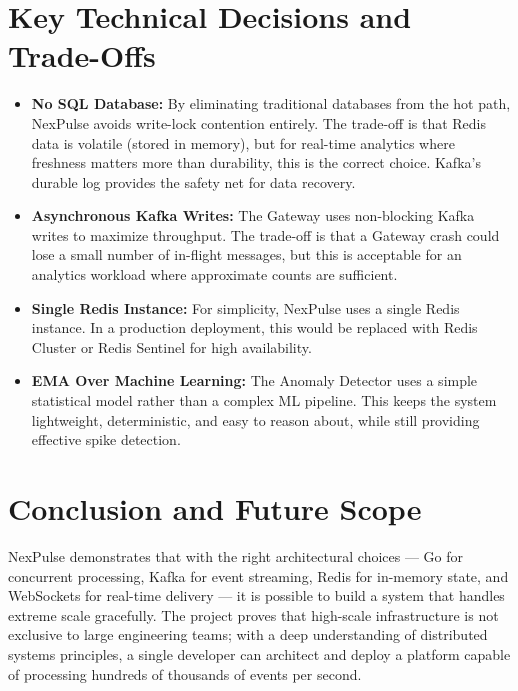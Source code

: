 \documentclass[12pt,a4paper]{article}
\begin{document}
\section{Key Technical Decisions and Trade-Offs}

\begin{itemize}[leftmargin=2em]
    \item \textbf{No SQL Database:} By eliminating traditional databases from the hot path, NexPulse avoids write-lock contention entirely. The trade-off is that Redis data is volatile (stored in memory), but for real-time analytics where freshness matters more than durability, this is the correct choice. Kafka's durable log provides the safety net for data recovery.
    \item \textbf{Asynchronous Kafka Writes:} The Gateway uses non-blocking Kafka writes to maximize throughput. The trade-off is that a Gateway crash could lose a small number of in-flight messages, but this is acceptable for an analytics workload where approximate counts are sufficient.
    \item \textbf{Single Redis Instance:} For simplicity, NexPulse uses a single Redis instance. In a production deployment, this would be replaced with Redis Cluster or Redis Sentinel for high availability.
    \item \textbf{EMA Over Machine Learning:} The Anomaly Detector uses a simple statistical model rather than a complex ML pipeline. This keeps the system lightweight, deterministic, and easy to reason about, while still providing effective spike detection.
\end{itemize}

\section{Conclusion and Future Scope}

NexPulse demonstrates that with the right architectural choices --- Go for concurrent processing, Kafka for event streaming, Redis for in-memory state, and WebSockets for real-time delivery --- it is possible to build a system that handles extreme scale gracefully. The project proves that high-scale infrastructure is not exclusive to large engineering teams; with a deep understanding of distributed systems principles, a single developer can architect and deploy a platform capable of processing hundreds of thousands of events per second.
\end{document}
